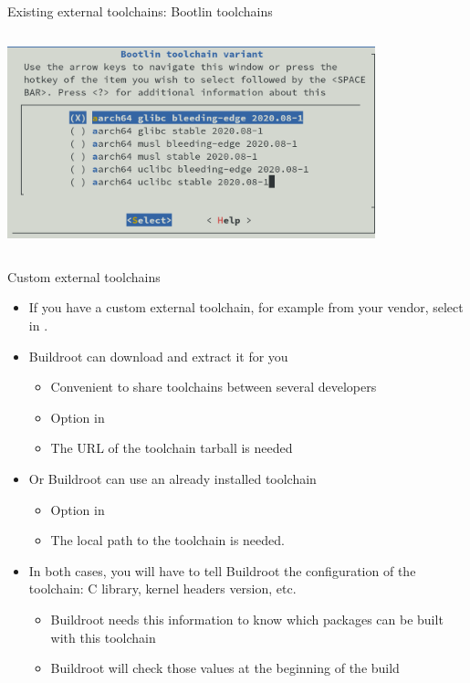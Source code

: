 \begin{frame}{Existing external toolchains: Bootlin toolchains}
\begin{columns}
\begin{center}
      \includegraphics[width=0.8\textwidth]{slides/buildroot-toolchain/bootlin-toolchains-menuconfig.png}
    \end{center}
  \end{columns}

\end{frame}

\begin{frame}{Custom external toolchains}
  \begin{itemize}
  \item If you have a custom external toolchain, for example from your
    vendor, select  in .
  \item Buildroot can download and extract it for you
    \begin{itemize}
    \item Convenient to share toolchains between several
      developers
    \item Option  in 
    \item The URL of the toolchain tarball is needed
    \end{itemize}
  \item Or Buildroot can use an already installed toolchain
    \begin{itemize}
    \item Option  in 
    \item The local path to the toolchain is needed.
    \end{itemize}
  \item In both cases, you will have to tell Buildroot the
    configuration of the toolchain: C library, kernel headers version,
    etc.
    \begin{itemize}
    \item Buildroot needs this information to know which packages can
      be built with this toolchain
    \item Buildroot will check those values at the beginning of the
      build
    \end{itemize}
  \end{itemize}
\end{frame}

